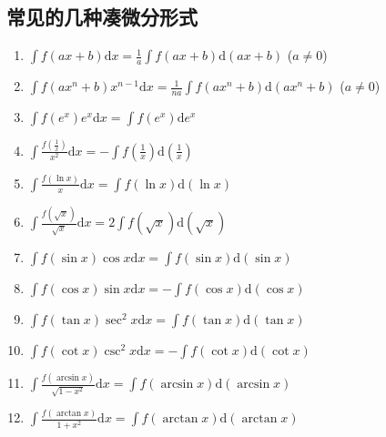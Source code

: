 \documentclass[UTF8]{ctexart}
\theoremstyle{remark}
\begin{document}
		\subsection{常见的几种凑微分形式}
		\begin{enumerate}
			\item \(\int f(ax + b)\mathrm{d}x=\frac{1}{a}\int f(ax + b)\mathrm{d}(ax + b)\) (\(a\neq0\))
			\item \(\int f(ax^{n}+b)x^{n - 1}\mathrm{d}x=\frac{1}{na}\int f(ax^{n}+b)\mathrm{d}(ax^{n}+b)\) (\(a\neq0\))
			\item \(\int f(e^{x})e^{x}\mathrm{d}x=\int f(e^{x})\mathrm{d}e^{x}\)
			\item \(\int\frac{f(\frac{1}{x})}{x^{2}}\mathrm{d}x=-\int f(\frac{1}{x})\mathrm{d}(\frac{1}{x})\)
			\item \(\int\frac{f(\ln x)}{x}\mathrm{d}x=\int f(\ln x)\mathrm{d}(\ln x)\)
			\item \(\int\frac{f(\sqrt{x})}{\sqrt{x}}\mathrm{d}x=2\int f(\sqrt{x})\mathrm{d}(\sqrt{x})\)
			\item \(\int f(\sin x)\cos x\mathrm{d}x=\int f(\sin x)\mathrm{d}(\sin x)\)
			\item \(\int f(\cos x)\sin x\mathrm{d}x=-\int f(\cos x)\mathrm{d}(\cos x)\)
		\end{enumerate}
		\begin{enumerate}
			\setcounter{enumi}{8}
			\item \(\int f(\tan x)\sec^{2}x\mathrm{d}x=\int f(\tan x)\mathrm{d}(\tan x)\)
			\item \(\int f(\cot x)\csc^{2}x\mathrm{d}x=-\int f(\cot x)\mathrm{d}(\cot x)\)
			\item \(\int\frac{f(\arcsin x)}{\sqrt{1 - x^{2}}}\mathrm{d}x=\int f(\arcsin x)\mathrm{d}(\arcsin x)\)
			\item \(\int\frac{f(\arctan x)}{1 + x^{2}}\mathrm{d}x=\int f(\arctan x)\mathrm{d}(\arctan x)\)
		\end{enumerate}
		
\end{document}
